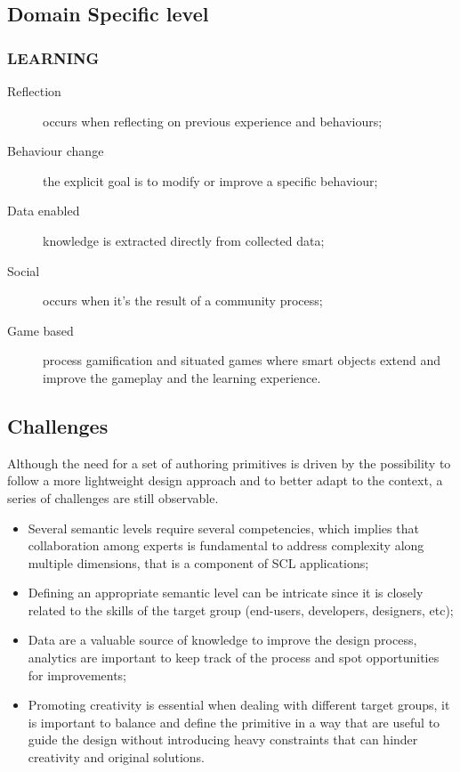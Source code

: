\subsection{Domain Specific level}
\medskip

\subsubsection{LEARNING}
\begin{description}
\item [Reflection] occurs when reflecting on previous experience and behaviours;
\item [Behaviour change] the explicit goal is to modify or improve a specific behaviour;
\item [Data enabled] knowledge is extracted directly from collected data;
\item [Social] occurs when it's the result of a community process;
\item [Game based] process gamification and situated games where smart objects extend and improve the gameplay and the learning experience.
\end{description}

\subsection{Challenges}
Although the need for a set of authoring primitives is driven by the possibility to follow a more lightweight design approach and to better adapt to the context, a series of challenges are still observable.

\begin{itemize}
    \item Several semantic levels require several competencies, which implies that collaboration among experts is fundamental to address complexity along multiple dimensions, that is a component of SCL applications;
    \item Defining an appropriate semantic level can be intricate since it is closely related to the skills of the target group (end-users, developers, designers, etc);
    \item Data are a valuable source of knowledge to improve the design process, analytics are important to keep track of the process and spot opportunities for improvements;
    \item Promoting creativity is essential when dealing with different target groups, it is important to balance and define the primitive in a way that are useful to guide the design without introducing heavy constraints that can hinder creativity and original solutions.
\end{itemize}

